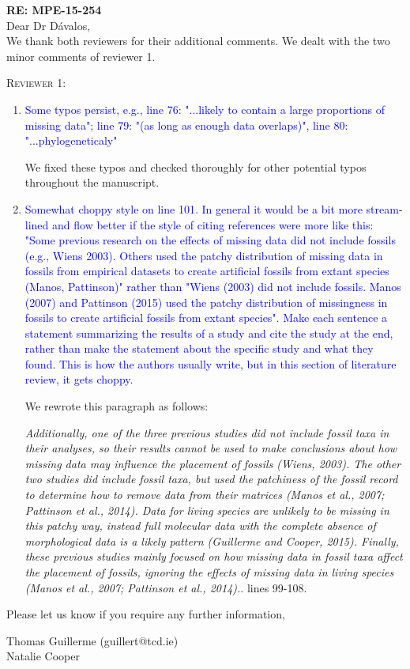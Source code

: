 \documentclass[12pt,letterpaper]{article}
\renewcommand{\section}[1]{%
\bigskip
\begin{center}
\begin{Large}
\normalfont\scshape #1
\medskip
\end{Large}
\end{center}}
\begin{document}
\textbf{RE: MPE-15-254}\\
\bigskip
Dear Dr D\'{a}valos,\\
\bigskip
We thank both reviewers for their additional comments.
We dealt with the two minor comments of reviewer 1.


\section{Reviewer 1:}

\begin{enumerate}
\item{\textcolor{blue}{Some typos persist, e.g., line 76: "...likely to contain a large proportions of missing data"; line 79: "(as long as enough data overlaps)", line 80: "...phylogeneticaly"}}

We fixed these typos and checked thoroughly for other potential typos throughout the manuscript.
\item{\textcolor{blue}{Somewhat choppy style on line 101. In general it would be a bit more stream-lined and flow better if the style of citing references were more like this: "Some previous research on the effects of missing data did not include fossils (e.g., Wiens 2003). Others used the patchy distribution of missing data in fossils from empirical datasets to create artificial fossils from extant species (Manos, Pattinson)" rather than "Wiens (2003) did not include fossils. Manos (2007) and Pattinson (2015) used the patchy distribution of missingness in fossils to create artificial fossils from extant species". Make each sentence a statement summarizing the results of a study and cite the study at the end, rather than make the statement about the specific study and what they found. This is how the authors usually write, but in this section of literature review, it gets choppy.}}

We rewrote this paragraph as follows:

\textit{Additionally, one of the three previous studies did not include fossil taxa in their analyses, so their results cannot be used to make conclusions about how missing data may influence the placement of fossils (Wiens, 2003). The other two studies did include fossil taxa, but used the patchiness of the fossil record to determine how to remove data from their matrices (Manos et al., 2007; Pattinson et al., 2014). Data for living species are unlikely to be missing in this patchy way, instead full molecular data with the complete absence of morphological data is a likely pattern (Guillerme and Cooper, 2015).
Finally, these previous studies mainly focused on how missing data in fossil taxa affect the placement of fossils, ignoring the effects of missing data in living species (Manos et al., 2007; Pattinson et al., 2014).}. lines 99-108.

\end{enumerate}

Please let us know if you require any further information,\\
\bigskip

Thomas Guillerme (guillert@tcd.ie)\\
Natalie Cooper
\end{document}
